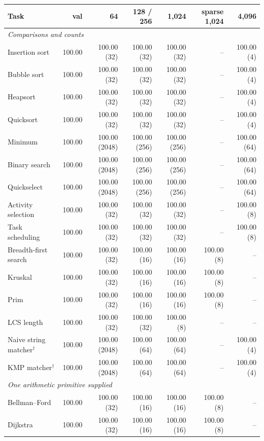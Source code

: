 \begin{tabular}{lrrrrrr}\toprule
Task & val & 64 & 128 / 256 & 1,024 & sparse 1,024 & 4,096 \\\midrule
\multicolumn{7}{l}{\textit{Comparisons and counts}} \\
Insertion sort & 100.00 & 100.00 (32) & 100.00 (32) & 100.00 (32) & -- & 100.00 (4) \\
Bubble sort & 100.00 & 100.00 (32) & 100.00 (32) & 100.00 (32) & -- & 100.00 (4) \\
Heapsort & 100.00 & 100.00 (32) & 100.00 (32) & 100.00 (32) & -- & 100.00 (4) \\
Quicksort & 100.00 & 100.00 (32) & 100.00 (32) & 100.00 (32) & -- & 100.00 (4) \\
Minimum & 100.00 & 100.00 (2048) & 100.00 (256) & 100.00 (256) & -- & 100.00 (64) \\
Binary search & 100.00 & 100.00 (2048) & 100.00 (256) & 100.00 (256) & -- & 100.00 (64) \\
Quickselect & 100.00 & 100.00 (2048) & 100.00 (256) & 100.00 (256) & -- & 100.00 (64) \\
Activity selection & 100.00 & 100.00 (32) & 100.00 (32) & 100.00 (32) & -- & 100.00 (8) \\
Task scheduling & 100.00 & 100.00 (32) & 100.00 (32) & 100.00 (32) & -- & 100.00 (8) \\
Breadth-first search & 100.00 & 100.00 (32) & 100.00 (16) & 100.00 (16) & 100.00 (8) & -- \\
Kruskal & 100.00 & 100.00 (32) & 100.00 (16) & 100.00 (16) & 100.00 (8) & -- \\
Prim & 100.00 & 100.00 (32) & 100.00 (16) & 100.00 (16) & 100.00 (8) & -- \\
LCS length & 100.00 & 100.00 (32) & 100.00 (32) & 100.00 (8) & -- & -- \\
Naive string matcher$^\dagger$ & 100.00 & 100.00 (2048) & 100.00 (64) & 100.00 (64) & -- & 100.00 (4) \\
KMP matcher$^\dagger$ & 100.00 & 100.00 (2048) & 100.00 (64) & 100.00 (64) & -- & 100.00 (4) \\
\multicolumn{7}{l}{\textit{One arithmetic primitive supplied}} \\
Bellman--Ford & 100.00 & 100.00 (32) & 100.00 (16) & 100.00 (16) & 100.00 (8) & -- \\
Dijkstra & 100.00 & 100.00 (32) & 100.00 (16) & 100.00 (16) & 100.00 (8) & -- \\

\end{tabular}

